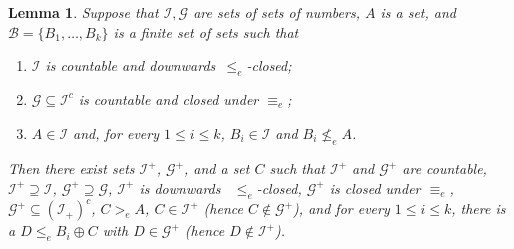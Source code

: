 \documentclass[11pt]{amsart}
\newtheorem{lemma}[theorem]{Lemma}
\begin{document}
\begin{lemma}\label{lem:a-splitting-2}
Suppose that $\mathcal{I},\mathcal{G}$ are sets of sets of numbers, $A$ is a
set, and $\mathcal{B}=\{B_1, \ldots, B_k\}$ is a finite set of sets such that 

\begin{enumerate}
  \item[(a)] $\mathcal{I}$ is countable and downwards~$\leq_e$-closed;
  \item[(b)] $\mathcal{G} \subseteq \mathcal{I}^c$ is countable and closed 
      under $\equiv_e$; 
  \item[(c)] $A \in \mathcal{I}$ and, for every $1\leq  i \leq k$, $B_i \in 
      \mathcal{I}$ and $B_i \nleq_e A$. 
\end{enumerate}
Then there exist sets $\mathcal{I}^+$, $\mathcal{G}^+$, and a set $C$
such that $\mathcal{I}^+$ and 
$\mathcal{G}^+$ are countable, $\mathcal{I}^+ \supseteq \mathcal{I}$, 
$\mathcal{G}^+ \supseteq \mathcal{G}$, $\mathcal{I}^+$ is downwards~ 
$\leq_e$-closed, $\mathcal{G}^+$ is closed under $\equiv_e$,  $\mathcal{G}^+ 
\subseteq (\mathcal{I}_+)^c$, $C 
>_e A$, $C \in \mathcal{I}^+$ (hence $C \notin \mathcal{G}^+$), 
and for every $1\leq i \leq k$, there is a $D \leq_e B_i \oplus C$
with $D \in \mathcal{G}^+$ (hence $D \notin \mathcal{I}^+$).
\end{lemma}
\end{document}
